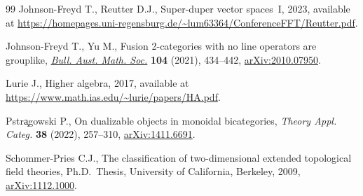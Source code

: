 \documentclass[11pt]{article}
\numberwithin{equation}{section}
\numberwithin{equation}{section}
\begin{document}
\begin{thebibliography}{99}
Johnson-Freyd T., Reutter D.J., Super-duper vector spaces~{I}, 2023, available
 at
 \url{https://homepages.uni-regensburg.de/~lum63364/ConferenceFFT/Reutter.pdf}.

Johnson-Freyd T., Yu M., Fusion 2-categories with no line operators are
 grouplike, \href{https://doi.org/10.1017/S0004972721000095}{\textit{Bull. Aust. Math. Soc.}} \textbf{104} (2021), 434--442,
 \href{https://arxiv.org/abs/2010.07950}{arXiv:2010.07950}.

Lurie J., Higher algebra, 2017, available at
 \url{https://www.math.ias.edu/~lurie/papers/HA.pdf}.

Pstr\c{a}gowski P., On dualizable objects in monoidal bicategories,
 \textit{Theory Appl. Categ.} \textbf{38} (2022), 257--310,
 \href{https://arxiv.org/abs/1411.6691}{arXiv:1411.6691}.

Schommer-Pries C.J., The classification of two-dimensional extended topological
 field theories, Ph.D.~Thesis, {U}niversity of California, Berkeley, 2009,
 \href{https://arxiv.org/abs/1112.1000}{arXiv:1112.1000}.

\end{thebibliography}
\end{document}
